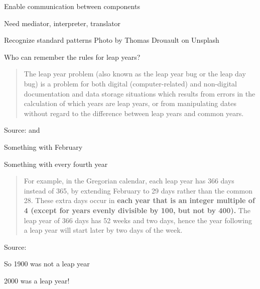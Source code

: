 \documentclass[Screen16to9,17pt]{foils}
\begin{document}



\begin{list2}
\item Enable communication between components
\item Need mediator, interpreter, translator
\item Recognize standard patterns \hfill Photo by Thomas Drouault on Unsplash
\end{list2}





Who can remember the rules for leap years?

\begin{quote}
The leap year problem (also known as the leap year bug or the leap day bug) is a problem for both digital (computer-related) and non-digital documentation and data storage situations which results from errors in the calculation of which years are leap years, or from manipulating dates without regard to the difference between leap years and common years.
\end{quote}
Source:  and

\begin{list2}
\item Something with February
\item Something with every fourth year
\end{list2}



\begin{quote}
For example, in the Gregorian calendar, each leap year has 366 days instead of 365, by extending February to 29 days rather than the common 28. These extra days occur in {\bf each year that is an integer multiple of 4 (except for years evenly divisible by 100, but not by 400).} The leap year of 366 days has 52 weeks and two days, hence the year following a leap year will start later by two days of the week.
\end{quote}
Source: 

\begin{list2}
\item So 1900 was not a leap year
\item 2000 was a leap year!
\end{list2}
\end{document}
